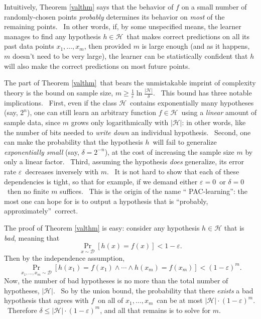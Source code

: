 \documentclass[12pt,onecolumn]{article}%
\begin{document}
Intuitively, Theorem \ref{valthm} says that the behavior of $f$ on a small
number of randomly-chosen points \textit{probably} determines its behavior on
\textit{most} of the remaining points. \ In other words, if, by some
unspecified means, the learner manages to find any hypothesis $h\in
\mathcal{H}$\ that makes correct predictions on all its past data points
$x_{1},\ldots,x_{m}$, then provided $m$ is large enough (and as it happens,
$m$ doesn't need to be very large), the learner can be statistically confident
that $h$ will also make the correct predictions on most future points.

The part of Theorem \ref{valthm}\ that bears the unmistakable imprint of
complexity theory is the bound on sample size, $m\geq\frac{1}{\varepsilon}%
\ln\frac{\left\vert \mathcal{H}\right\vert }{\delta}$. \ This bound has three
notable implications. \ First, even if the class $\mathcal{H}$\ contains
exponentially many hypotheses (say, $2^{n}$), one can still learn an arbitrary
function $f\in\mathcal{H}$\ using a \textit{linear} amount of sample data,
since $m$ grows only logarithmically with $\left\vert \mathcal{H}\right\vert
$: in other words, like the number of bits needed to \textit{write down} an
individual hypothesis. \ Second, one can make the probability that the
hypothesis $h$\ will fail to generalize \textit{exponentially small} (say,
$\delta=2^{-n}$), at the cost of increasing the sample size $m$ by only a
linear factor. \ Third, assuming the hypothesis \textit{does} generalize, its
error rate $\varepsilon$\ decreases inversely with $m$. \ It is not hard to
show that each of these dependencies is tight, so that for example, if we
demand either $\varepsilon=0$\ or $\delta=0$\ then no finite $m$ suffices.
\ This is the origin of the name \textquotedblleft
PAC-learning\textquotedblright: the most one can hope for is to output a
hypothesis that is \textquotedblleft probably, approximately\textquotedblright\ correct.

The proof of Theorem \ref{valthm} is easy: consider any hypothesis
$h\in\mathcal{H}$ that is \textit{bad}, meaning that%
\[
\Pr_{x\sim\mathcal{D}}\left[  h\left(  x\right)  =f\left(  x\right)  \right]
<1-\varepsilon.
\]
Then by the independence assumption,%
\[
\Pr_{x_{1},\ldots,x_{m}\sim\mathcal{D}}\left[  h\left(  x_{1}\right)
=f\left(  x_{1}\right)  \wedge\cdots\wedge h\left(  x_{m}\right)  =f\left(
x_{m}\right)  \right]  <\left(  1-\varepsilon\right)  ^{m}.
\]
Now, the number of bad hypotheses is no more than the total number of
hypotheses, $\left\vert \mathcal{H}\right\vert $. \ So by the union bound, the
probability that there \textit{exists} a bad hypothesis that agrees with
$f$\ on all of $x_{1},\ldots,x_{m}$\ can be at most $\left\vert \mathcal{H}%
\right\vert \cdot\left(  1-\varepsilon\right)  ^{m}$. \ Therefore $\delta
\leq\left\vert \mathcal{H}\right\vert \cdot\left(  1-\varepsilon\right)  ^{m}%
$, and all that remains is to solve for $m$.
\end{document}
